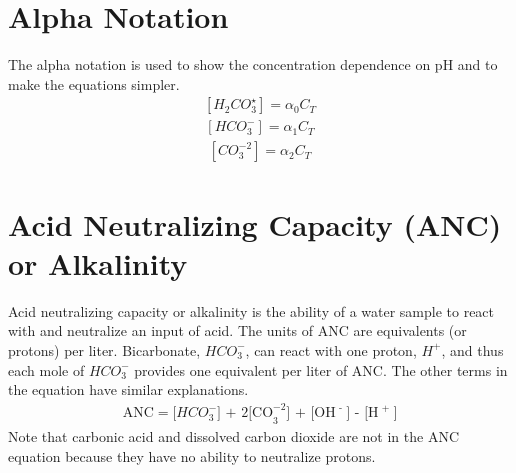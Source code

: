 \documentclass[letterpaper,10pt,english]{sphinxmanual}
\begin{document}
\section{Alpha Notation}
\label{\detokenize{Rapid_Mix/RM_Examples:alpha-notation}}\label{\detokenize{Rapid_Mix/RM_Examples:heading-alpha-notation}}
The alpha notation is used to show the concentration dependence on pH and to make the equations simpler.
\begin{equation}\label{equation:Rapid_Mix/RM_Examples:Rapid_Mix/RM_Examples:6}
\begin{split}\left[ {{H_2}CO_3^{\star} } \right] = {\alpha_0}{C_T}\end{split}
\end{equation}\begin{equation}\label{equation:Rapid_Mix/RM_Examples:Rapid_Mix/RM_Examples:7}
\begin{split}\left[ {HCO_3^-} \right] = {\alpha_1}{C_T}\end{split}
\end{equation}\begin{equation}\label{equation:Rapid_Mix/RM_Examples:Rapid_Mix/RM_Examples:8}
\begin{split}\left[ {CO_3^{-2}} \right] = {\alpha_2}{C_T}\end{split}
\end{equation}

\section{Acid Neutralizing Capacity (ANC) or Alkalinity}
\label{\detokenize{Rapid_Mix/RM_Examples:acid-neutralizing-capacity-anc-or-alkalinity}}\label{\detokenize{Rapid_Mix/RM_Examples:heading-acid-neutralizing-capacity-anc-or-alkalinity}}
Acid neutralizing capacity or alkalinity is the ability of a water sample to react with and neutralize an input of acid. The units of ANC are equivalents (or protons) per liter. Bicarbonate, \(HCO_3^-\), can react with one proton, \(H^+\), and thus each mole of \(HCO_3^-\) provides one equivalent per liter of ANC. The other terms in the equation have similar explanations.
\begin{equation}\label{equation:Rapid_Mix/RM_Examples:Rapid_Mix/RM_Examples:9}
\begin{split}{\text{ANC}} = [HCO_3^ - {\text{] + 2[CO}}_3^{ - 2}{\text{] + [O}}{{\text{H}}^{\text{ - }}}{\text{] - [}}{{\text{H}}^{\text{ + }}}{\text{]}}\end{split}
\end{equation}
Note that carbonic acid and dissolved carbon dioxide are not in the ANC equation because they have no ability to neutralize protons.
\end{document}
